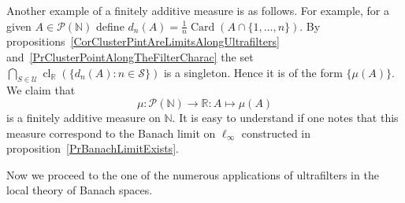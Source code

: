 \documentclass[12pt]{article}
\begin{document}
Another example of a finitely additive measure is as follows. For example, for a
given $A\in\mathcal{P}(\mathbb{N})$ define
$d_n(A)=\frac{1}{n}\operatorname{Card}(A\cap \{1,\ldots,n\})$. By
propositions~\ref{CorClusterPintAreLimitsAlongUltrafilters}
and~\ref{PrClusterPointAlongTheFilterCharac} the set
$\bigcap_{S\in\mathcal{U}}\operatorname{cl}_{\mathbb{R}}(\{d_n(A):n\in\mathcal{S}\})$
is a singleton. Hence it is of the form $\{\mu(A)\}$. We claim that
$$
    \mu:\mathcal{P}(\mathbb{N})\to\mathbb{R}:A\mapsto\mu(A)
$$
is a finitely additive measure on $\mathbb{N}$. It is easy to understand if one
notes that this measure correspond to the Banach limit on ${\ell}_\infty$
constructed in proposition~\ref{PrBanachLimitExists}.

Now we proceed to the one of the numerous applications of ultrafilters in the
local theory of Banach spaces.
\end{document}
